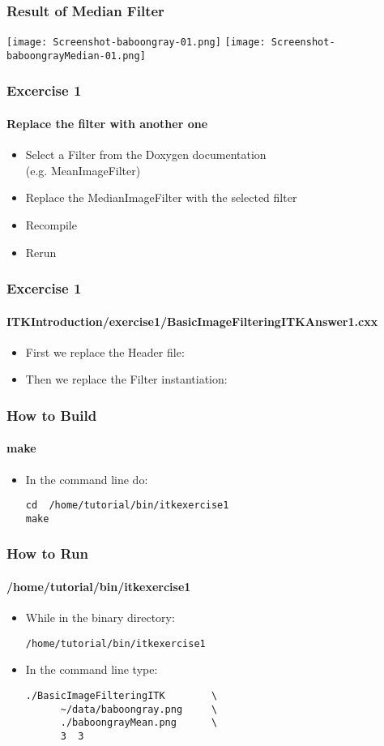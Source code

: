 \begin{frame}[fragile]
\frametitle{Result of Median Filter}
\begin{center}
  \texttt{[image: Screenshot-baboongray-01.png]}
  \texttt{[image: Screenshot-baboongrayMedian-01.png]}
\end{center}
\end{frame}

\begin{frame}[fragile]
\frametitle{Excercise 1}
\framesubtitle{Replace the filter with another one}
\begin{itemize}
\item Select a Filter from the Doxygen documentation\\
(e.g. MeanImageFilter)
\item Replace the MedianImageFilter with the selected filter
\item Recompile
\item Rerun
\end{itemize}
\end{frame}

\begin{frame}
\frametitle{Excercise 1}
\framesubtitle{ITKIntroduction/exercise1/BasicImageFilteringITKAnswer1.cxx}
\begin{itemize}
\item First we replace the Header file:
\end{itemize}
\begin{itemize}
\item Then we replace the Filter instantiation:
\end{itemize}
\end{frame}

\begin{frame}[fragile]
\frametitle{How to Build}
\framesubtitle{make}
\begin{itemize}
\item In the command line do:
\begin{verbatim}
cd  /home/tutorial/bin/itkexercise1
make
\end{verbatim}
\end{itemize}
\end{frame}

\begin{frame}[fragile]
\frametitle{How to Run}
\framesubtitle{/home/tutorial/bin/itkexercise1}
\begin{itemize}
\item While in the binary directory:
\begin{verbatim}
/home/tutorial/bin/itkexercise1
\end{verbatim}
\item In the command line type:
\begin{verbatim}
./BasicImageFilteringITK        \
      ~/data/baboongray.png     \
      ./baboongrayMean.png      \
      3  3
\end{verbatim}
\end{itemize}
\end{frame}

